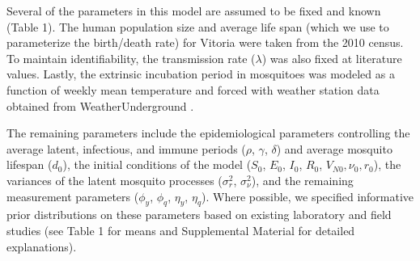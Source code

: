 \documentclass[10pt,letterpaper]{article}
\begin{document}
Several of the parameters in this model are assumed to be fixed and known (Table 1).
The human population size and average life span (which we use to parameterize the birth/death rate) for Vitoria were taken from the 2010 census.
To maintain identifiability, the transmission rate ($\lambda$) was also fixed at literature values.
Lastly, the extrinsic incubation period in mosquitoes was modeled as a function of weekly mean temperature and forced with weather station data obtained from WeatherUnderground \cite{weather}.

The remaining parameters include the epidemiological parameters controlling the average latent, infectious, and immune periods ($\rho$, $\gamma$, $\delta$) and average mosquito lifespan ($d_0$), the initial conditions of the model ($S_0$, $E_0$, $I_0$, $R_0$, $V_{N0}, \nu_0, r_0$), the variances of the latent mosquito processes ($\sigma^2_r$, $\sigma^2_{\nu}$), and the remaining measurement parameters ($\phi_y$, $\phi_q$, $\eta_y$, $\eta_q$).  
Where possible, we specified informative prior distributions on these parameters based on existing laboratory and field studies (see Table 1 for means and Supplemental Material for detailed explanations).
\end{document}

